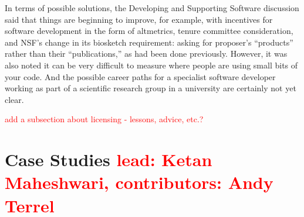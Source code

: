 \documentclass[11pt, oneside]{amsart}
\newcommand{\note}[1]{ {\textcolor{red}    { #1 }}}
\begin{document}
In terms of possible solutions, the Developing and Supporting Software discussion said that things are beginning to improve, for example, with incentives for software development in the form of altmetrics, tenure committee consideration, and NSF's change in its biosketch requirement: asking for proposer's ``products'' rather than their ``publications,'' as had been done previously.
However, it was also noted it can be very difficult to measure where people are using small bits of your code.  And the possible career paths for a specialist software developer working as part of a scientific research group in a university are certainly not yet clear.

\note{add a subsection about licensing - lessons, advice, etc.?}

\section{Case Studies \note{lead: Ketan Maheshwari, contributors: Andy Terrel}} \label{sec:use-cases}





\end{document}
